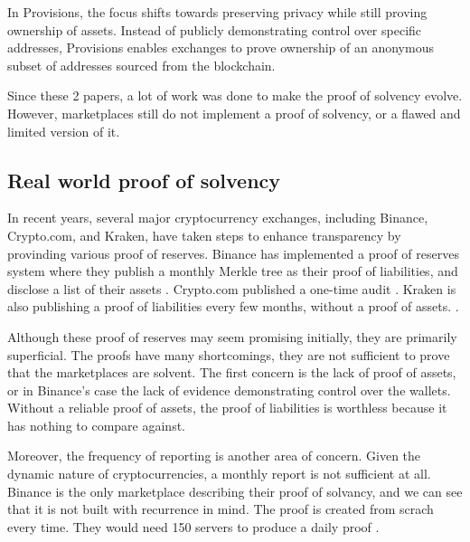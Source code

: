 In Provisions, the focus shifts towards preserving privacy while still proving ownership of assets. 
Instead of publicly demonstrating control over specific addresses, Provisions enables exchanges to prove ownership of an anonymous subset of addresses sourced from the blockchain.

Since these 2 papers, a lot of work was done to make the proof of solvency evolve. However, marketplaces still do not implement a proof of solvency, or a flawed and limited version of it.


\subsection{Real world proof of solvency} 
In recent years, several major cryptocurrency exchanges, including Binance, Crypto.com, and Kraken, have taken steps to enhance transparency by provinding various proof of reserves.
Binance has implemented a proof of reserves system where they publish a monthly Merkle tree as their proof of liabilities, and disclose a list of their assets \cite{BPR}. 
Crypto.com published a one-time audit \cite{CC22}. 
Kraken is also publishing a proof of liabilities every few months, without a proof of assets. \cite{KK23}.

Although these proof of reserves may seem promising initially, they are primarily superficial.
The proofs have many shortcomings, they are not sufficient to prove that the marketplaces are solvent.
The first concern is the lack of proof of assets, or in Binance's case the lack of evidence demonstrating control over the wallets.
Without a reliable proof of assets, the proof of liabilities is worthless because it has nothing to compare against.

Moreover, the frequency of reporting is another area of concern. Given the dynamic nature of cryptocurrencies, a monthly report is not sufficient at all.
Binance is the only marketplace describing their proof of solvancy, and we can see that it is not built with recurrence in mind.
The proof is created from scrach every time. They would need 150 servers to produce a daily proof \cite{BPS}.




 



